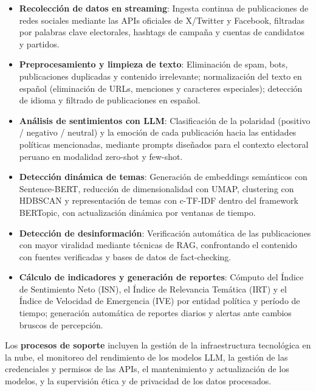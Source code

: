 \documentclass[listof=nochaptergap,12pt,times,authoryear]{report}
\begin{document}
\begin{itemize}
    \item \textbf{Recolección de datos en streaming}: Ingesta continua de publicaciones de
    redes sociales mediante las APIs oficiales de X/Twitter y Facebook, filtradas por
    palabras clave electorales, hashtags de campaña y cuentas de candidatos y partidos.
 
    \item \textbf{Preprocesamiento y limpieza de texto}: Eliminación de spam, bots,
    publicaciones duplicadas y contenido irrelevante; normalización del texto en español
    (eliminación de URLs, menciones y caracteres especiales); detección de idioma y
    filtrado de publicaciones en español.
 
    \item \textbf{Análisis de sentimientos con LLM}: Clasificación de la polaridad
    (positivo / negativo / neutral) y la emoción de cada publicación hacia las entidades
    políticas mencionadas, mediante prompts diseñados para el contexto electoral peruano
    en modalidad zero-shot y few-shot.
 
    \item \textbf{Detección dinámica de temas}: Generación de embeddings semánticos
    con Sentence-BERT, reducción de dimensionalidad con UMAP, clustering con HDBSCAN
    y representación de temas con c-TF-IDF dentro del framework BERTopic, con
    actualización dinámica por ventanas de tiempo.
 
    \item \textbf{Detección de desinformación}: Verificación automática de las
    publicaciones con mayor viralidad mediante técnicas de RAG, confrontando el
    contenido con fuentes verificadas y bases de datos de fact-checking.
 
    \item \textbf{Cálculo de indicadores y generación de reportes}: Cómputo del Índice
    de Sentimiento Neto (ISN), el Índice de Relevancia Temática (IRT) y el Índice de
    Velocidad de Emergencia (IVE) por entidad política y período de tiempo; generación
    automática de reportes diarios y alertas ante cambios bruscos de percepción.
\end{itemize}
 
Los \textbf{procesos de soporte} incluyen la gestión de la infraestructura tecnológica
en la nube, el monitoreo del rendimiento de los modelos LLM, la gestión de las
credenciales y permisos de las APIs, el mantenimiento y actualización de los modelos, y la
supervisión ética y de privacidad de los datos procesados.
\end{document}
